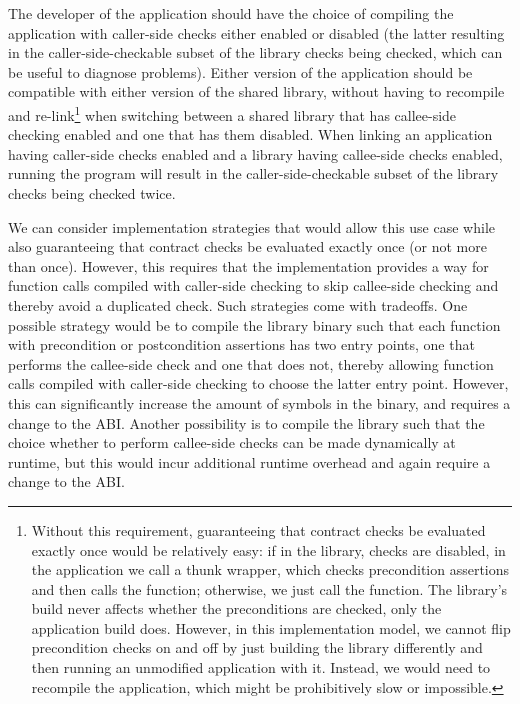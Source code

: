 The developer of the application should have the choice of compiling the application with caller-side checks either enabled or disabled (the latter resulting in the caller-side-checkable subset of the library checks being checked, which can be useful to diagnose problems). Either version of the application should be compatible with either version of the shared library, without having to recompile and re-link\footnote{Without this requirement, guaranteeing that contract checks be evaluated exactly once would be relatively easy: if in the library, checks are disabled, in the application we call a thunk wrapper, which checks precondition assertions and then calls the function; otherwise, we just call the function. The library's build never affects whether the preconditions are checked, only the application build does. However, in this implementation model, we cannot flip precondition checks on and off by just building the library differently and then running an unmodified application with it. Instead, we would need to recompile the application, which might be prohibitively slow or impossible.} when switching between a shared library that has callee-side checking enabled and one that has them disabled. When linking an application having caller-side checks enabled and a library having callee-side checks enabled, running the program will result in the caller-side-checkable subset of the library checks being checked twice.

We can consider implementation strategies that would allow this use case while also guaranteeing that contract checks be evaluated exactly once (or not more than once). However, this requires that the implementation provides a way for function calls compiled with caller-side checking to skip callee-side checking and thereby avoid a duplicated check. Such strategies come with tradeoffs. One possible strategy would be to compile the library binary such that each function with precondition or postcondition assertions has two entry points, one that performs the callee-side check and one that does not, thereby allowing function calls compiled with caller-side checking to choose the latter entry point. However, this can significantly increase the amount of symbols in the binary, and requires a change to the ABI. Another possibility is to compile the library such that the choice whether to perform callee-side checks can be made dynamically at runtime, but this would incur additional runtime overhead and again require a change to the ABI.

